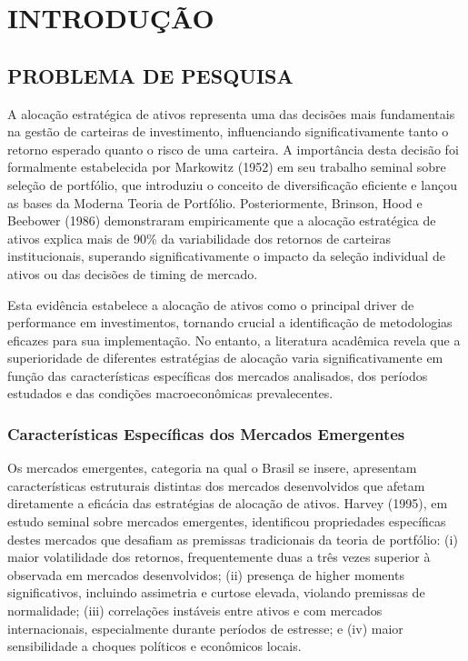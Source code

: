 
\chapter{INTRODUÇÃO}

\section{PROBLEMA DE PESQUISA}

A alocação estratégica de ativos representa uma das decisões mais fundamentais na gestão de carteiras de investimento, influenciando significativamente tanto o retorno esperado quanto o risco de uma carteira. A importância desta decisão foi formalmente estabelecida por Markowitz (1952) em seu trabalho seminal sobre seleção de portfólio, que introduziu o conceito de diversificação eficiente e lançou as bases da Moderna Teoria de Portfólio. Posteriormente, Brinson, Hood e Beebower (1986) demonstraram empiricamente que a alocação estratégica de ativos explica mais de 90\% da variabilidade dos retornos de carteiras institucionais, superando significativamente o impacto da seleção individual de ativos ou das decisões de timing de mercado.

Esta evidência estabelece a alocação de ativos como o principal driver de performance em investimentos, tornando crucial a identificação de metodologias eficazes para sua implementação. No entanto, a literatura acadêmica revela que a superioridade de diferentes estratégias de alocação varia significativamente em função das características específicas dos mercados analisados, dos períodos estudados e das condições macroeconômicas prevalecentes.

\subsection{Características Específicas dos Mercados Emergentes}

Os mercados emergentes, categoria na qual o Brasil se insere, apresentam características estruturais distintas dos mercados desenvolvidos que afetam diretamente a eficácia das estratégias de alocação de ativos. Harvey (1995), em estudo seminal sobre mercados emergentes, identificou propriedades específicas destes mercados que desafiam as premissas tradicionais da teoria de portfólio: (i) maior volatilidade dos retornos, frequentemente duas a três vezes superior à observada em mercados desenvolvidos; (ii) presença de higher moments significativos, incluindo assimetria e curtose elevada, violando premissas de normalidade; (iii) correlações instáveis entre ativos e com mercados internacionais, especialmente durante períodos de estresse; e (iv) maior sensibilidade a choques políticos e econômicos locais.

